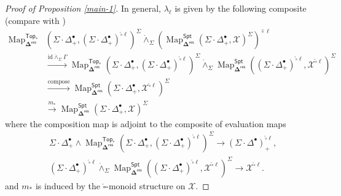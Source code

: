 \documentclass[11pt]{amsart}
\theoremstyle{definition}
\theoremstyle{remark}
\newcommand{\Top}{\mathsf{Top}_*}
\newcommand{\Spt}{\mathsf{Spt}}
\newcommand{\Tot}{\operatorname{\mathsf{Tot}}}
\newcommand{\Map}{\operatorname{Map}}
\newcommand{\id}{\mathrm{id}}
\newcommand{\Cal}[1]{\mathcal{#1}}
\newcommand{\circhat}{\hat{\circ}}
\newcommand{\boxcirc}{\mathring{\square}}
\newcommand{\SD}{\Sigma{\cdot}\Delta^{\bullet}}
\newcommand{\bdel}{\mathbf{\Delta}}
\newcommand{\Dres}{\bdel^{\mathsf{res}}}
\begin{document}
\begin{proof}[Proof of Proposition \ref{main-1}]
In general, $\lambda_{\ell}$ is given by the following composite (compare with \cite[(1.13)]{AC-coalg}) \begin{align*}
    \Map_{\Dres}^{\Top} &\left(\SD_+, (\SD_+)^{\boxcirc \ell}\right)^{\Sigma}\dot{\wedge}_{\Sigma}  \left(\Map_{\Dres}^{\Spt}\left(\SD_+, \Cal{X}\right)^{\Sigma}\right)^{\circhat \ell}\\
    &
    \xrightarrow{\id\dot{\wedge}_{\Sigma}  \Gamma} 
    \Map_{\Dres}^{\Top}\left(\SD_+, (\SD_+)^{\boxcirc\ell} \right)^{\Sigma} \dot{\wedge}_{\Sigma}  \Map_{\Dres}^{\Spt}\left((\SD_+)^{\boxcirc \ell}, \Cal{X}^{\boxcirc \ell}\right)^{\Sigma} 
    \\
    &
    \xrightarrow{\text{compose}} \Map_{\Dres}^{\Spt}\left(\SD_+, \Cal{X}^{\boxcirc \ell} \right)^{\Sigma} 
    \\
    & \xrightarrow{m_*} \Map_{\Dres}^{\Spt}\left(\SD_+, \Cal{X}\right)^{\Sigma}
\end{align*}
where the composition map is adjoint to the composite of evaluation maps
\begin{align}
    &\SD_+ \wedge \Map_{\Dres}^{\Top}( \SD_+, (\SD_+)^{\boxcirc \ell} )^{\Sigma} \to  (\SD)^{\boxcirc \ell}_+, \\
    &(\SD_+)^{\boxcirc \ell} \dot{\wedge}_{\Sigma} \Map_{\Dres}^{\Spt} ((\SD_+)^{\boxcirc \ell}, \Cal{X}^{\boxcirc \ell} )^{\Sigma} \to \Cal{X}^{\boxcirc \ell}.
    \nonumber \end{align}
and $m_*$ is induced by the $\boxcirc$-monoid structure on $\Cal{X}$.





\end{proof}
\end{document}

